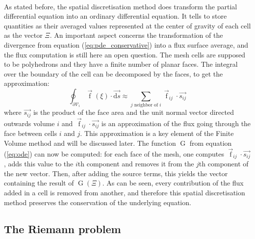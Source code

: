       \paragraph{}
      As stated before, the spatial discretisation method does transform the partial differential equation into an ordinary differential equation.
      It tells to store quantities as their averaged values represented at the center of gravity of each cell as the vector $\Xi$.
      An important aspect concerns the transformation of the divergence from equation (\ref{eq:pde_conservative}) into a flux surface average, and the flux computation is still here an open question.
      The mesh cells are supposed to be polyhedrons and they have a finite number of planar faces.
      The integral over the boundary of the cell can be decomposed by the faces, to get the approximation:
      \begin{equation}
        \oint_{\partial\mathcal{V}_i} \vec{\operatorname{f}}\left(\xi\right) \cdot \vec{\mathrm{d}s} \approx \sum_{j\textrm{ neighbor of } i} \vec{\operatorname{f}}_{ij} \cdot \vec{s_{ij}}
      \end{equation}
      where $\vec{s_{ij}}$ is the product of the face area and the unit normal vector directed outwards volume $i$ and $\vec{\operatorname{f}}_{ij} \cdot \vec{s_{ij}}$ is an approximation of the flux going through the face between cells $i$ and $j$.
      This approximation is a key element of the Finite Volume method and will be discussed later.
      The function $\operatorname{G}$ from equation (\ref{eq:ode}) can now be computed: for each face of the mesh, one computes $\vec{\operatorname{f}}_{ij} \cdot \vec{s_{ij}}$, adds this value to the $i$th component and removes it from the $j$th component of the new vector.
      Then, after adding the source terms, this yields the vector containing the result of $\operatorname{G}\left(\Xi\right)$.
      As can be seen, every contribution of the flux added in a cell is removed from another, and therefore this spatial discretisation method preserves the conservation of the underlying equation.


    \subsection{The Riemann problem}

